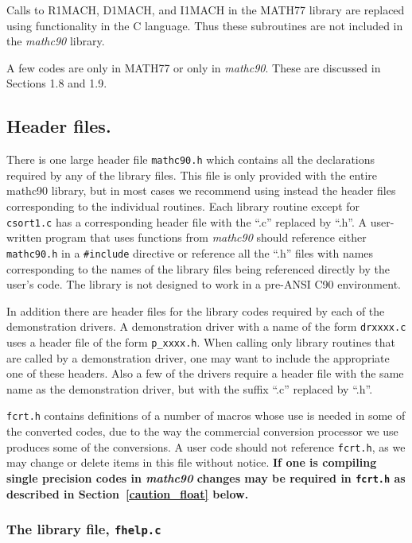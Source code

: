 \documentclass[twoside]{MATH77}
\begin{document}
Calls to R1MACH, D1MACH, and I1MACH in the MATH77 library are replaced
using functionality in the C language.  Thus these subroutines
are not included in the {\em mathc90} library.

A few codes are only in MATH77 or only in {\em mathc90}.  These are
discussed in Sections 1.8 and 1.9.

\subsection{Header files.\label{Headers}}

There is one large header file {\tt mathc90.h} which contains all the
declarations required by any of the library files.  This file is only provided
with the entire mathc90 library, but in most cases we recommend using instead
the header files corresponding to the individual routines.  Each library
routine except for {\tt csort1.c} has a corresponding header file with the
``.c'' replaced by ``.h''.  A user-written program that uses functions from
{\em mathc90} should reference either {\tt mathc90.h} in a {\tt \#include}
directive or reference all the ``.h'' files with names corresponding to the
names of the library files being referenced directly by the user's code.  The
library is not designed to work in a pre-ANSI C90 environment.

In addition there are header files for the library codes required by each
of the demonstration drivers.  A demonstration driver with a name of the
form {\tt drxxxx.c} uses a header file of the form {\tt p\_xxxx.h}.  When
calling only library routines that are called by a demonstration driver,
one may want to include the appropriate one of these headers.  Also a few of
the drivers require a header file with the same name as the demonstration
driver, but with the suffix ``.c'' replaced by ``.h''.

{\tt fcrt.h} contains definitions of a number of macros whose use is
needed in some of the converted codes, due to the way the commercial
conversion processor we use produces some of the conversions.  A user code
should not reference {\tt fcrt.h}, as we may change or delete items in
this file without notice.  {\bf If one is compiling single precision codes
in {\em mathc90} changes may be required in {\tt fcrt.h} as described in
Section~\ref{caution_float} below.}

\subsubsection{The library file, {\tt fhelp.c}\label{libfile}}
\end{document}
